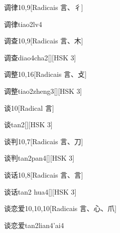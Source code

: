 \begin{entry}{调律}{10,9}[Radicais ⾔、⼻]
  \begin{phonetics}{调律}{tiao2lv4}
  \end{phonetics}
\end{entry}

\begin{entry}{调查}{10,9}[Radicais ⾔、⽊]
  \begin{phonetics}{调查}{diao4cha2}[][HSK 3]
  \end{phonetics}
\end{entry}

\begin{entry}{调整}{10,16}[Radicais ⾔、⽁]
  \begin{phonetics}{调整}{tiao2zheng3}[][HSK 3]
  \end{phonetics}
\end{entry}

\begin{entry}{谈}{10}[Radical ⾔]
  \begin{phonetics}{谈}{tan2}[][HSK 3]
  \end{phonetics}
\end{entry}

\begin{entry}{谈判}{10,7}[Radicais ⾔、⼑]
  \begin{phonetics}{谈判}{tan2pan4}[][HSK 3]
  \end{phonetics}
\end{entry}

\begin{entry}{谈话}{10,8}[Radicais ⾔、⾔]
  \begin{phonetics}{谈话}{tan2 hua4}[][HSK 3]
  \end{phonetics}
\end{entry}

\begin{entry}{谈恋爱}{10,10,10}[Radicais ⾔、⼼、⽖]
  \begin{phonetics}{谈恋爱}{tan2lian4'ai4}
  \end{phonetics}
\end{entry}

